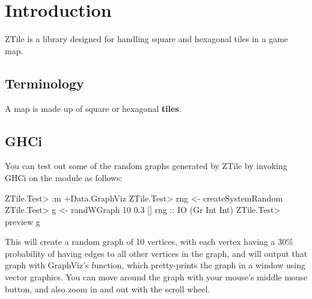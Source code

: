 \chapter{Introduction}

ZTile is a library designed for handling square and hexagonal tiles in a game map.

\section{Terminology}

A map is made up of square or hexagonal \textbf{tiles}.

\section{GHCi}

You can test out some of the random graphs generated by ZTile by invoking GHCi on the  module as follows:

\begin{console}
ZTile.Test> :m +Data.GraphViz
ZTile.Test> rng <- createSystemRandom
ZTile.Test> g <- randWGraph 10 0.3 [] rng :: IO (Gr Int Int)
ZTile.Test> preview g
\end{console}

This will create a random graph of 10 vertices, with each vertex having a 30\% probability of having edges to all other vertices in the graph, and will output that graph with GraphViz's  function, which pretty-prints the graph in a window using vector graphics.
You can move around the graph with your mouse's middle mouse button, and also zoom in and out with the scroll wheel.

